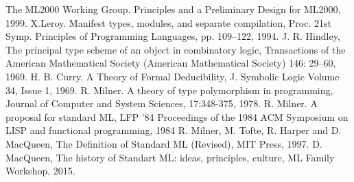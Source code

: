 \documentclass[14pt]{matmex-diploma-custom}
\begin{document}
\begin{thebibliography}{9}
     The ML2000 Working Group. Principles and a Preliminary Design for ML2000, 1999.
     X.Leroy. Manifest types, modules, and separate compilation, Proc. 21st Symp. Principles of Programming Languages, pp. 109–122, 1994.
     J. R. Hindley, The principal type scheme of an object in combinatory logic, Transactions of the American Mathematical Society (American Mathematical Society) 146: 29–60, 1969.
     H. B. Curry. A Theory of Formal Deducibility, J. Symbolic Logic Volume 34, Issue 1, 1969.
     R. Milner. A theory of type polymorphism in programming, Journal of Computer and System Sciences, 17:348-375, 1978.
     R. Milner. A proposal for standard ML, LFP '84 Proceedings of the 1984 ACM Symposium on LISP and functional programming, 1984
     R. Milner, M. Tofte, R. Harper and D. MacQueen, The Definition of Standard ML (Revised), MIT Press, 1997.
     D. MacQueen, The history of Standart ML: ideas, principles, culture, ML Family Workshop, 2015.
\end{thebibliography}
\end{document}
